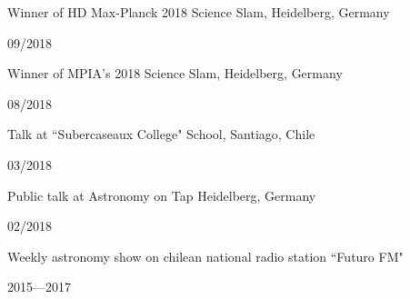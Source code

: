 \documentclass[11pt, a4paper]{article} %
\begin{document}
\begin{minipage}[t]{0.7\textwidth}
\begin{flushleft}%
  \setlength{\leftskip}{0.2cm}%
Winner of HD Max-Planck 2018 Science Slam, Heidelberg, Germany 
\end{flushleft}
\end{minipage}
\begin{minipage}[t]{0.3\textwidth}
\hfill 09/2018
\end{minipage}

\begin{minipage}[t]{0.7\textwidth}
\begin{flushleft}%
  \setlength{\leftskip}{0.2cm}%
Winner of MPIA's 2018 Science Slam, Heidelberg, Germany 
\end{flushleft}
\end{minipage}
\begin{minipage}[t]{0.3\textwidth}
\hfill 08/2018
\end{minipage}

\begin{minipage}[t]{0.7\textwidth}
\begin{flushleft}%
  \setlength{\leftskip}{0.2cm}%
Talk at ``Subercaseaux College" School, Santiago, Chile
\end{flushleft}
\end{minipage}
\begin{minipage}[t]{0.3\textwidth}
\hfill 03/2018
\end{minipage}

\begin{minipage}[t]{0.7\textwidth}
\begin{flushleft}%
  \setlength{\leftskip}{0.2cm}%
Public talk at Astronomy on Tap Heidelberg, Germany 
\end{flushleft}
\end{minipage}
\begin{minipage}[t]{0.3\textwidth}
\hfill 02/2018
\end{minipage}

\begin{minipage}[t]{0.7\textwidth}
\begin{flushleft}%
  \setlength{\leftskip}{0.2cm}%
Weekly astronomy show on chilean national radio station ``Futuro FM"
\end{flushleft}
\end{minipage}
\begin{minipage}[t]{0.3\textwidth}
\hfill 2015---2017
\end{minipage}
\end{document}
